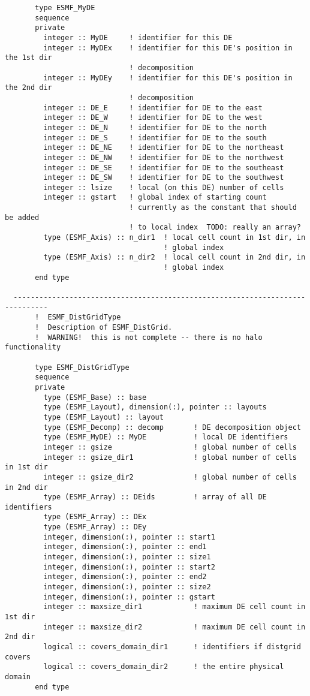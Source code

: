 \begin{verbatim}
       type ESMF_MyDE
       sequence
       private
         integer :: MyDE     ! identifier for this DE
         integer :: MyDEx    ! identifier for this DE's position in the 1st dir
                             ! decomposition
         integer :: MyDEy    ! identifier for this DE's position in the 2nd dir
                             ! decomposition
         integer :: DE_E     ! identifier for DE to the east
         integer :: DE_W     ! identifier for DE to the west
         integer :: DE_N     ! identifier for DE to the north
         integer :: DE_S     ! identifier for DE to the south
         integer :: DE_NE    ! identifier for DE to the northeast
         integer :: DE_NW    ! identifier for DE to the northwest
         integer :: DE_SE    ! identifier for DE to the southeast
         integer :: DE_SW    ! identifier for DE to the southwest
         integer :: lsize    ! local (on this DE) number of cells
         integer :: gstart   ! global index of starting count
                             ! currently as the constant that should be added
                             ! to local index  TODO: really an array?
         type (ESMF_Axis) :: n_dir1  ! local cell count in 1st dir, in
                                     ! global index
         type (ESMF_Axis) :: n_dir2  ! local cell count in 2nd dir, in
                                     ! global index
       end type
 
  ------------------------------------------------------------------------------
       !  ESMF_DistGridType
       !  Description of ESMF_DistGrid. 
       !  WARNING!  this is not complete -- there is no halo functionality
 
       type ESMF_DistGridType
       sequence
       private
         type (ESMF_Base) :: base
         type (ESMF_Layout), dimension(:), pointer :: layouts
         type (ESMF_Layout) :: layout
         type (ESMF_Decomp) :: decomp       ! DE decomposition object
         type (ESMF_MyDE) :: MyDE           ! local DE identifiers
         integer :: gsize                   ! global number of cells
         integer :: gsize_dir1              ! global number of cells in 1st dir
         integer :: gsize_dir2              ! global number of cells in 2nd dir
         type (ESMF_Array) :: DEids         ! array of all DE identifiers
         type (ESMF_Array) :: DEx
         type (ESMF_Array) :: DEy
         integer, dimension(:), pointer :: start1
         integer, dimension(:), pointer :: end1
         integer, dimension(:), pointer :: size1
         integer, dimension(:), pointer :: start2
         integer, dimension(:), pointer :: end2
         integer, dimension(:), pointer :: size2
         integer, dimension(:), pointer :: gstart
         integer :: maxsize_dir1            ! maximum DE cell count in 1st dir
         integer :: maxsize_dir2            ! maximum DE cell count in 2nd dir
         logical :: covers_domain_dir1      ! identifiers if distgrid covers
         logical :: covers_domain_dir2      ! the entire physical domain
       end type
 

\end{verbatim}
